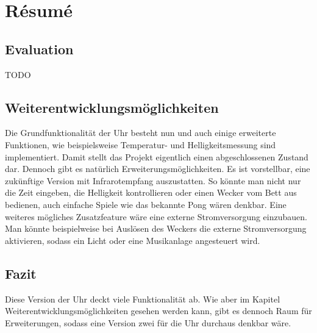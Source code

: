 \section{Résumé}
\subsection{Evaluation}
TODO

\subsection{Weiterentwicklungsmöglichkeiten}
Die Grundfunktionalität der Uhr besteht nun und auch einige erweiterte Funktionen, wie beispielsweise Temperatur- und Helligkeitsmessung sind implementiert. Damit stellt das Projekt eigentlich einen abgeschlossenen Zustand dar. Dennoch gibt es natürlich Erweiterungsmöglichkeiten. Es ist vorstellbar, eine zukünftige Version mit Infrarotempfang auszustatten. So könnte man nicht nur die Zeit eingeben, die Helligkeit kontrollieren oder einen Wecker vom Bett aus bedienen, auch einfache Spiele wie das bekannte Pong wären denkbar. Eine weiteres mögliches Zusatzfeature wäre eine externe Stromversorgung einzubauen. Man könnte beispielweise bei Auslösen des Weckers die externe Stromversorgung aktivieren, sodass ein Licht oder eine Musikanlage angesteuert wird.

%
\subsection{Fazit}
Diese Version der Uhr deckt viele Funktionalität ab. Wie aber im Kapitel Weiterentwicklungsmöglichkeiten gesehen werden kann, gibt es dennoch Raum für Erweiterungen, sodass eine Version zwei für die Uhr durchaus denkbar wäre.
